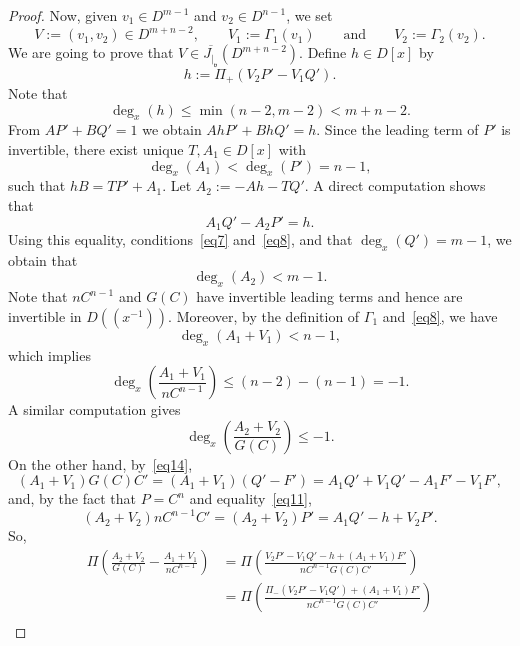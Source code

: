 \documentclass[reqno,a4paper]{amsart}
\theoremstyle{definition}
\theoremstyle{remark}
\newcommand{\ov}{\overline}
\begin{document}
\begin{proof}
Now, given $v_1\in D^{m-1}$ and $v_2 \in D^{n-1}$, we set
$$
V := (v_1,v_2)\in D^{m+n-2},\qquad V_1:=\Gamma_1(v_1)\qquad\text{and}\qquad V_2:=\Gamma_2(v_2).
$$
We are going to prove that $V\in  \ov{J_{|_{\mathfrak{v}}}}(D^{m+n-2})$. Define $h\in D[x]$ by
\begin{equation}
h:=\Pi_+(V_2 P'-V_1 Q').\label{eq10}
\end{equation}
Note that
\begin{equation}
\deg_x(h)\le \min(n-2,m-2)<m+n-2.\label{eq7}
\end{equation}
From $AP'+BQ'=1$ we obtain $AhP'+BhQ'=h$. Since the leading term of $P'$ is invertible, there exist unique
$T,A_1\in D[x]$ with
\begin{equation}
\deg_x(A_1)<\deg_x(P')=n-1,\label{eq8}
\end{equation}
such that $hB=TP'+A_1$. Let $A_2:=-Ah-TQ'$. A direct computation shows that
\begin{equation}
A_1 Q' - A_2 P' = h.\label{eq11}
\end{equation}
Using this equality, conditions~\eqref{eq7} and~\eqref{eq8}, and that $\deg_x(Q') = m-1$, we obtain that
\begin{equation}
\deg_x(A_2)<m-1.\label{eq9}
\end{equation}
Note that $nC^{n-1}$ and $G(C)$ have invertible leading terms and hence are invertible in $D((x^{-1}))$.
Moreover, by the definition of $\Gamma_1$ and~\eqref{eq8}, we have
\begin{equation}
\deg_x(A_1+V_1)<n-1,\label{eq12}
\end{equation}
which implies
\begin{equation}
\deg_x\left(\frac{A_1+V_1}{nC^{n-1}}\right)\le (n-2)-(n-1)=-1.\label{eq12,1}
\end{equation}
A similar computation gives
\begin{equation}
\deg_x\left(\frac{A_2+V_2}{G(C)} \right)\le -1.\label{eq12,2}
\end{equation}
On the other hand, by~\eqref{eq14},
$$
(A_1+V_1)G(C)C' = (A_1+V_1)(Q'-F') = A_1Q'+V_1Q'- A_1F'-V_1F',
$$
and, by the fact that $P=C^n$ and equality~\eqref{eq11},
$$
(A_2+V_2)nC^{n-1}C' = (A_2+V_2)P' = A_1Q'-h+V_2P'.
$$
So,
\begin{align*}
\Pi\left( \frac{A_2+V_2}{G(C)}-\frac{A_1+V_1}{nC^{n-1}}\right)&= \Pi\left(\frac{V_2 P'-V_1
Q'-h+(A_1+V_1)F'}{nC^{n-1}G(C)C'}\right)\\
%
&=\Pi\left(\frac{\Pi_-(V_2 P'-V_1 Q')+(A_1+V_1)F'}{nC^{n-1}G(C)C'}\right)\\

\end{align*}
\end{proof}
\end{document}

